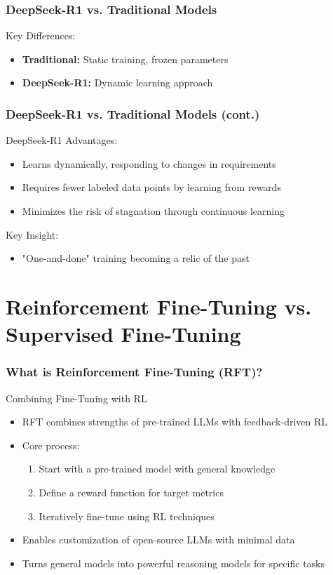 \documentclass[aspectratio=169]{beamer}
\begin{document}
\begin{frame}[shrink=20]
	\frametitle{DeepSeek-R1 vs. Traditional Models}
	\vspace{-0.2cm}
	\begin{block}{Key Differences:}
		\setlength{\itemsep}{0.5em}
		\begin{itemize}
			\item \textbf{Traditional:} Static training, frozen parameters
			\item \textbf{DeepSeek-R1:} Dynamic learning approach
		\end{itemize}
	\end{block}
\end{frame}

\begin{frame}
	\frametitle{DeepSeek-R1 vs. Traditional Models (cont.)}
	\begin{block}{DeepSeek-R1 Advantages:}
		\begin{itemize}
			\item Learns dynamically, responding to changes in requirements
			\item Requires fewer labeled data points by learning from rewards
			\item Minimizes the risk of stagnation through continuous learning
		\end{itemize}
	\end{block}
	\begin{block}{Key Insight:}
		\begin{itemize}
			\item "One-and-done" training becoming a relic of the past
		\end{itemize}
	\end{block}
\end{frame}

\section{Reinforcement Fine-Tuning vs. Supervised Fine-Tuning}

\begin{frame}
	\frametitle{What is Reinforcement Fine-Tuning (RFT)?}
	\begin{block}{Combining Fine-Tuning with RL}
		\begin{itemize}
			\item RFT combines strengths of pre-trained LLMs with feedback-driven RL
			\item Core process:
			\begin{enumerate}
				\item Start with a pre-trained model with general knowledge
				\item Define a reward function for target metrics
				\item Iteratively fine-tune using RL techniques
			\end{enumerate}
			\item Enables customization of open-source LLMs with minimal data
			\item Turns general models into powerful reasoning models for specific tasks
		\end{itemize}
	\end{block}
\end{frame}
\end{document}
